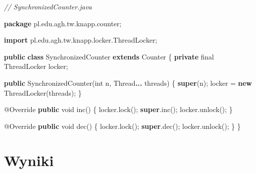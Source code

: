 \documentclass[11pt]{article}
\newenvironment{Shaded}{}{}
\newcommand{\KeywordTok}[1]{\textcolor[rgb]{0.00,0.44,0.13}{\textbf{{#1}}}}
\newcommand{\DataTypeTok}[1]{\textcolor[rgb]{0.56,0.13,0.00}{{#1}}}
\newcommand{\CommentTok}[1]{\textcolor[rgb]{0.38,0.63,0.69}{\textit{{#1}}}}
\newcommand{\FunctionTok}[1]{\textcolor[rgb]{0.02,0.16,0.49}{{#1}}}
\newcommand{\NormalTok}[1]{{#1}}
\newcommand{\ImportTok}[1]{{#1}}
\newcommand{\OperatorTok}[1]{\textcolor[rgb]{0.40,0.40,0.40}{{#1}}}
\newcommand{\BuiltInTok}[1]{{#1}}
\newcommand{\AttributeTok}[1]{\textcolor[rgb]{0.49,0.56,0.16}{{#1}}}
\begin{document}
\begin{Shaded}
\begin{Highlighting}[]
\CommentTok{// SynchronizedCounter.java}

\KeywordTok{package}\ImportTok{ pl}\OperatorTok{.}\ImportTok{edu}\OperatorTok{.}\ImportTok{agh}\OperatorTok{.}\ImportTok{tw}\OperatorTok{.}\ImportTok{knapp}\OperatorTok{.}\ImportTok{counter}\OperatorTok{;}

\KeywordTok{import} \ImportTok{pl}\OperatorTok{.}\ImportTok{edu}\OperatorTok{.}\ImportTok{agh}\OperatorTok{.}\ImportTok{tw}\OperatorTok{.}\ImportTok{knapp}\OperatorTok{.}\ImportTok{locker}\OperatorTok{.}\ImportTok{ThreadLocker}\OperatorTok{;}

\KeywordTok{public} \KeywordTok{class}\NormalTok{ SynchronizedCounter }\KeywordTok{extends}\NormalTok{ Counter }\OperatorTok{\{}
    \KeywordTok{private} \DataTypeTok{final}\NormalTok{ ThreadLocker locker}\OperatorTok{;}

    \KeywordTok{public} \FunctionTok{SynchronizedCounter}\OperatorTok{(}\DataTypeTok{int}\NormalTok{ n}\OperatorTok{,} \BuiltInTok{Thread}\KeywordTok{...}\NormalTok{ threads}\OperatorTok{)} \OperatorTok{\{}
        \KeywordTok{super}\OperatorTok{(}\NormalTok{n}\OperatorTok{);}
\NormalTok{        locker }\OperatorTok{=} \KeywordTok{new} \FunctionTok{ThreadLocker}\OperatorTok{(}\NormalTok{threads}\OperatorTok{);}
    \OperatorTok{\}}

    \AttributeTok{@Override}
    \KeywordTok{public} \DataTypeTok{void} \FunctionTok{inc}\OperatorTok{()} \OperatorTok{\{}
\NormalTok{        locker}\OperatorTok{.}\FunctionTok{lock}\OperatorTok{();}
        \KeywordTok{super}\OperatorTok{.}\FunctionTok{inc}\OperatorTok{();}
\NormalTok{        locker}\OperatorTok{.}\FunctionTok{unlock}\OperatorTok{();}
    \OperatorTok{\}}

    \AttributeTok{@Override}
    \KeywordTok{public} \DataTypeTok{void} \FunctionTok{dec}\OperatorTok{()} \OperatorTok{\{}
\NormalTok{        locker}\OperatorTok{.}\FunctionTok{lock}\OperatorTok{();}
        \KeywordTok{super}\OperatorTok{.}\FunctionTok{dec}\OperatorTok{();}
\NormalTok{        locker}\OperatorTok{.}\FunctionTok{unlock}\OperatorTok{();}
    \OperatorTok{\}}
\OperatorTok{\}}
\end{Highlighting}
\end{Shaded}

    \hypertarget{wyniki}{%
\section{Wyniki}\label{wyniki}}
\end{document}
